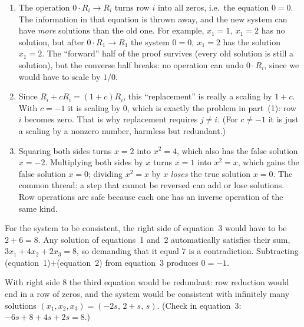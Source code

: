 \documentclass[11pt]{article}
\begin{document}
\begin{description}[leftmargin=0pt,itemsep=5pt]
\begin{enumerate}[label=(\arabic*),nosep,leftmargin=*]
          \item The operation $0\cdot R_i\to R_i$ turns row $i$ into all zeros, i.e.\ the equation
                $0=0$. The information in that equation is thrown away, and the new system can have
                \emph{more} solutions than the old one. For example, $x_1=1,\ x_1=2$ has no
                solution, but after $0\cdot R_1\to R_1$ the system $0=0,\ x_1=2$ has the solution
                $x_1=2$. The ``forward'' half of the proof survives (every old solution is still a
                solution), but the converse half breaks: no operation can undo $0\cdot R_i$, since we
                would have to scale by $1/0$.
          \item Since $R_i+cR_i=(1+c)R_i$, this ``replacement'' is really a scaling by $1+c$. With
                $c=-1$ it is scaling by $0$, which is exactly the problem in part~(1): row $i$ becomes
                zero. That is why replacement requires $j\neq i$. (For $c\neq-1$ it is just a scaling by
                a nonzero number, harmless but redundant.)
          \item Squaring both sides turns $x=2$ into $x^2=4$, which also has the false solution
                $x=-2$. Multiplying both sides by $x$ turns $x=1$ into $x^2=x$, which gains the false
                solution $x=0$; dividing $x^2=x$ by $x$ \emph{loses} the true solution $x=0$.
                The common thread: a step that cannot be reversed can add or lose solutions. Row
                operations are safe because each one has an inverse operation of the same kind.
        \end{enumerate}
  \item[Pause and think \ref{think:contradiction}.] For the system to be consistent, the right side of
        equation~3 would have to be $2+6=8$. Any solution of equations~1 and~2 automatically satisfies
        their sum, $3x_1+4x_2+2x_3=8$, so demanding that it equal $7$ is a contradiction. Subtracting
        (equation~1)$+$(equation~2) from equation~3 produces $0=-1$.
 
        With right side $8$ the third equation would be redundant: row reduction would end in a row of
        zeros, and the system would be consistent with infinitely many solutions
        $(x_1,x_2,x_3)=(-2s,\,2+s,\,s)$. (Check in equation~3: $-6s+8+4s+2s=8$.)
 

\end{description}
\end{document}
